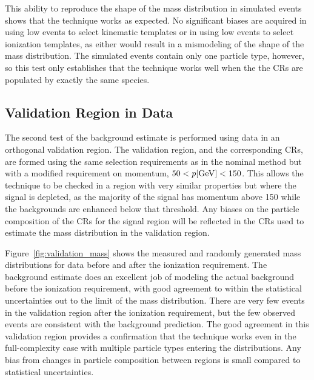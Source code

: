 This ability to reproduce the shape of the mass distribution in simulated events shows that the technique works as expected.
No significant biases are acquired in using low \dedx events to select kinematic templates or in using low \met events to select ionization templates, as either would result in a mismodeling of the shape of the mass distribution.
The simulated events contain only one particle type, however, so this test only establishes that the technique works well when the the \acp{CR} are populated by exactly the same species.

\subsection{Validation Region in Data}
The second test of the background estimate is performed using data in an orthogonal validation region.
The validation region, and the corresponding \acp{CR}, are formed using the same selection requirements as in the nominal method but with a modified requirement on momentum, $50 < p [\mathrm{Ge\kern -0.05em V}] < 150$.
This allows the technique to be checked in a region with very similar properties but where the signal is depleted, as the majority of the signal has momentum above 150 \GeV while the backgrounds are enhanced below that threshold.
Any biases on the particle composition of the \acp{CR} for the signal region will be reflected in the \acp{CR} used to estimate the mass distribution in the validation region.


Figure~\ref{fig:validation_mass} shows the measured and randomly generated mass distributions for data before and after the ionization requirement.
The background estimate does an excellent job of modeling the actual background before the ionization requirement, with good agreement to within the statistical uncertainties out to the limit of the mass distribution.
There are very few events in the validation region after the ionization requirement, but the few observed events are consistent with the background prediction.
The good agreement in this validation region provides a confirmation that the technique works even in the full-complexity case with multiple particle types entering the distributions.
Any bias from changes in particle composition between regions is small compared to statistical uncertainties.

